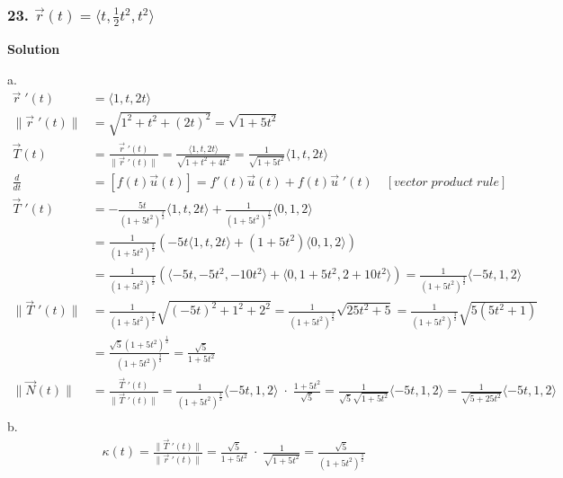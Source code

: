 \documentclass{article}
\newcommand{\drvec}{\vec{r}\;'(t)}
\begin{document}
\subsubsection*{23. $\vec{r}(t) = \langle{t, \frac{1}{2}t^2, t^2} \rangle$}
\centerline{\textbf{Solution}}
a. 
\begin{align*}
    \drvec &= \langle 1, t, 2t \rangle \\
    \|\drvec\| &= \sqrt{1^2 + t^2 + (2t)^2} = \sqrt{1 + 5t^2} \\ 
    \vec T(t) &= \frac{\drvec}{\|\drvec\|} = \frac{\langle 1, t, 2t \rangle}{\sqrt{1 + t^2 + 4t^2}} = \frac{1}{\sqrt{1 + 5t^2}}\langle 1, t, 2t \rangle \\
    \frac{d}{dt} &= [f(t)\vec u (t)] = f'(t)\vec u (t) + f(t)\vec u \;'(t) \quad [vector\;product\;rule] \\  
    \vec T\;'(t) &= -\frac{5t}{(1+5t^2)^{\frac 3 2}}\langle 1, t, 2t\rangle + \frac{1}{(1+5t^2)^\frac 1 2}\langle 0, 1, 2 \rangle \\
                 &= \frac{1}{(1+5t^2)^{\frac 3 2}}\left(-5t \langle 1, t, 2t \rangle + (1+5t^2)\langle 0, 1, 2 \rangle\right) \\
                 &= \frac{1}{(1+5t^2)^{\frac 3 2}}\left(\langle -5t, -5t^2, -10t^2 \rangle + \langle 0, 1+5t^2, 2+10t^2 \rangle\right) = \frac{1}{(1+5t^2)^{\frac 3 2}} \langle -5t, 1, 2 \rangle \\
    \|\vec T\;'(t)\| &= \frac{1}{(1+5t^2)^{\frac 3 2}}\sqrt{(-5t)^2 + 1^2 + 2^2} = \frac{1}{(1+5t^2)^{\frac 3 2}}\sqrt{25t^2 + 5} = \frac{1}{(1+5t^2)^{\frac 3 2}}\sqrt{5(5t^2 + 1)} \\
                     &= \frac{\sqrt 5 (1+5t^2)^{\frac 1 2}}{(1+5t^2)^{\frac 3 2}} = \frac{\sqrt 5}{1+5t^2} \\
    \|\vec N(t)\| &=  \frac{\vec T\;'(t)}{\|\vec T\;'(t)\|} = \frac{1}{(1+5t^2)^{\frac 3 2}} \langle -5t, 1, 2 \rangle \; \cdot \; \frac{1+5t^2}{\sqrt 5} = \frac{1}{\sqrt 5\sqrt{1+5t^2}} \langle -5t, 1, 2 \rangle  = \frac{1}{\sqrt{5+25t^2}}\langle -5t, 1, 2 \rangle\\ 
\end{align*}
b.
\begin{align*}
    \kappa(t) = \frac{\|\vec T\;'(t)\|}{\|\drvec\|} = \frac{\sqrt 5}{1+5t^2} \; \cdot \; \frac{1}{\sqrt{1+5t^2}} = \frac{\sqrt 5}{(1+5t^2)^{\frac 3 2}}
\end{align*}
\end{document}
